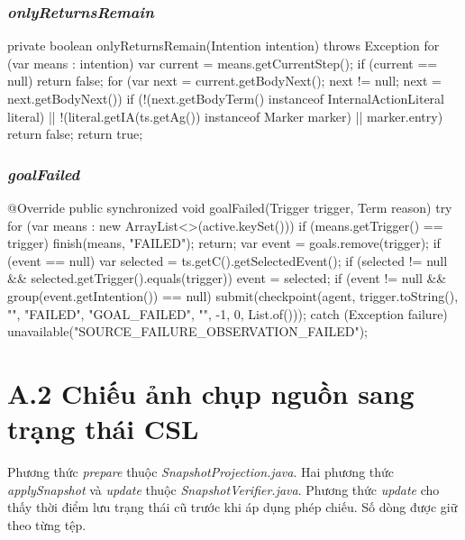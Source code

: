 \documentclass[12pt,a4paper,oneside]{extreport}
\begin{document}
\subsubsection*{\textit{onlyReturnsRemain}}
\begin{thesiscode}[firstnumber=275]
private boolean onlyReturnsRemain(Intention intention) throws Exception {
    for (var means : intention) {
        var current = means.getCurrentStep();
        if (current == null) return false;
        for (var next = current.getBodyNext(); next != null; next = next.getBodyNext()) {
            if (!(next.getBodyTerm() instanceof InternalActionLiteral literal)
                    || !(literal.getIA(ts.getAg()) instanceof Marker marker) || marker.entry) return false;
        }
    }
    return true;
}
\end{thesiscode}

\subsubsection*{\textit{goalFailed}}
\begin{thesiscode}[firstnumber=302]
@Override public synchronized void goalFailed(Trigger trigger, Term reason) {
    try {
        for (var means : new ArrayList<>(active.keySet())) if (means.getTrigger() == trigger) {
            finish(means, "FAILED"); return;
        }
        var event = goals.remove(trigger);
        if (event == null) {
            var selected = ts.getC().getSelectedEvent();
            if (selected != null && selected.getTrigger().equals(trigger)) event = selected;
        }
        if (event != null && group(event.getIntention()) == null)
            submit(checkpoint(agent, trigger.toString(), "", "FAILED", "GOAL_FAILED", "", -1, 0, List.of()));
    } catch (Exception failure) { unavailable("SOURCE_FAILURE_OBSERVATION_FAILED"); }
}
\end{thesiscode}

\section*{A.2 Chiếu ảnh chụp nguồn sang trạng thái CSL}
\label{app:projection-source}

Phương thức \textit{prepare} thuộc \textit{SnapshotProjection.java}. Hai phương thức \textit{applySnapshot} và \textit{update} thuộc \textit{SnapshotVerifier.java}. Phương thức \textit{update} cho thấy thời điểm lưu trạng thái cũ trước khi áp dụng phép chiếu. Số dòng được giữ theo từng tệp.
\end{document}
